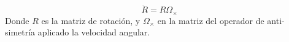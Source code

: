 \documentclass[10pt]{report}
\numberwithin{equation}{chapter}
\numberwithin{algorithm}{chapter}
\newcommand{\vect}[1]{\boldsymbol{#1}}
\newcommand{\marco}[1]{\{\mathcal{#1}\}}
\begin{document}
\begin{equation}\label{modelo_ecc71}
\dot{R}=R\Omega_\times
\end{equation}
Donde $R$ es la matriz de rotación, y $\Omega_\times$ en la matriz del operador de anti-simetría aplicado la velocidad angular.
\end{document}
